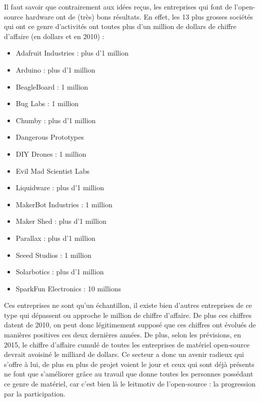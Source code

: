 \medskip
Il faut savoir que contrairement aux idées reçus, les entreprises qui font de l'open-source hardware ont de (très) bons résultats. En effet, les 13 plus grosses sociétés qui ont ce genre d'activités ont toutes plus d'un million de dollars de chiffre d'affaire (en dollars et en 2010) :
\begin{itemize}
\item Adafruit Industries : plus d'1 million
\item Arduino : plus d'1 million
\item BeagleBoard : 1 million
\item Bug Labs : 1 million
\item Chumby : plus d'1 million
\item Dangerous Prototypes
\item DIY Drones : 1 million
\item Evil Mad Scientist  Labs
\item Liquidware : plus d'1 million
\item MakerBot Industries : 1 million
\item Maker Shed : plus d'1 million
\item Parallax : plus d'1 million
\item Seeed Studios : 1 million
\item Solarbotics : plus d'1 million
\item SparkFun Electronics : 10 millions
\end{itemize} 
Ces entreprises ne sont qu'un échantillon, il existe bien d'autres entreprises de ce type qui dépassent ou approche le million de chiffre d'affaire. De plus ces chiffres datent de 2010, on peut donc légitimement supposé que ces chiffres ont évolués de manières positives ces deux dernières années. De plus, selon les prévisions, en 2015, le chiffre d'affaire cumulé de toutes les entreprises de matériel open-source devrait avoisiné le milliard de dollars.
\medskip
Ce secteur a donc un avenir radieux qui s'offre à lui, de plus en plus de projet voient le jour et ceux qui sont déjà présents ne font que s'améliorer grâce au travail que donne toutes les personnes possédant ce genre de matériel, car c'est bien là le leitmotiv de l'open-source : la progression par la participation.
